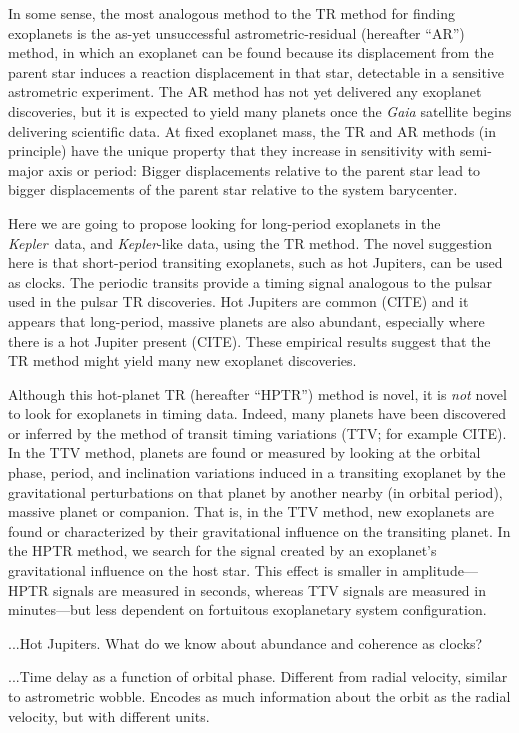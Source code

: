 \documentclass[12pt, preprint]{aastex}
\newcommand{\project}[1]{\textsl{#1}}
\newcommand{\Kepler}{\project{Kepler}}
\begin{document}
In some sense, the most analogous method to the TR method for finding
exoplanets is the as-yet unsuccessful astrometric-residual (hereafter
``AR'') method, in which an exoplanet can be found because its
displacement from the parent star induces a reaction displacement in
that star, detectable in a sensitive astrometric experiment.
The AR method has not yet delivered any exoplanet discoveries, but it
is expected to yield many planets once the \project{Gaia} satellite
begins delivering scientific data.
At fixed exoplanet mass, the TR and AR methods (in principle) have the
unique property that they increase in sensitivity with semi-major axis
or period:
Bigger displacements relative to the parent star lead to bigger
displacements of the parent star relative to the system barycenter.

Here we are going to propose looking for long-period exoplanets in the
\Kepler\ data, and \Kepler-like data, using the TR method.
The novel suggestion here is that short-period transiting exoplanets,
such as hot Jupiters, can be used as clocks.
The periodic transits provide a timing signal analogous to the pulsar
used in the pulsar TR discoveries.
Hot Jupiters are common (CITE) and it appears that long-period,
massive planets are also abundant, especially where there is a hot
Jupiter present (CITE).
These empirical results suggest that the TR method might yield many
new exoplanet discoveries.

Although this hot-planet TR (hereafter ``HPTR'') method is novel, it
is \emph{not} novel to look for exoplanets in timing data.
Indeed, many planets have been discovered or inferred by the method of
transit timing variations (TTV; for example CITE).
In the TTV method, planets are found or measured by looking at the
orbital phase, period, and inclination variations induced in a
transiting exoplanet by the gravitational perturbations on that planet
by another nearby (in orbital period), massive planet or companion.
That is, in the TTV method, new exoplanets are found or characterized by their
gravitational influence on the transiting planet.
In the HPTR method, we search for the signal created by an exoplanet's
gravitational influence on the host star.
This effect is smaller in amplitude---HPTR signals are measured in
seconds, whereas TTV signals are measured in minutes---but less
dependent on fortuitous exoplanetary system configuration.

...Hot Jupiters.  What do we know about abundance and coherence as
clocks?

...Time delay as a function of orbital phase.  Different from radial
velocity, similar to astrometric wobble.  Encodes as much information
about the orbit as the radial velocity, but with different units.
\end{document}
